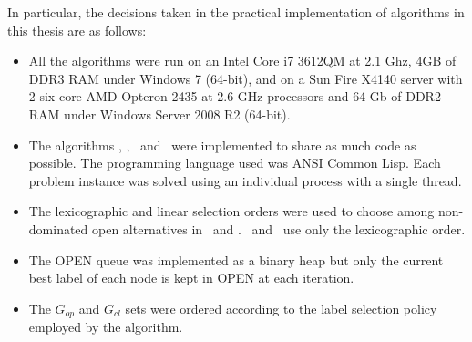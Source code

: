 In particular, the decisions taken in the practical implementation of algorithms in this thesis are as follows:
\begin{itemize}
	\item All the algorithms were run on an Intel Core i7 3612QM at 2.1 Ghz, 4GB of DDR3 RAM under Windows 7 (64-bit), and on a Sun Fire X4140 server with 2 six-core AMD Opteron 2435 at 2.6 GHz processors and 64 Gb of DDR2 RAM under Windows Server 2008 R2 (64-bit).
    \item The algorithms \namoa, \namoate, \lexgo\ and \lexgote \ were implemented to share as much code as possible. The programming language used was ANSI Common Lisp. Each problem instance was solved using an individual process with a single thread.
    \item The lexicographic and linear selection orders were used to choose among non-dominated open alternatives in \namoa \ and \lexgo. \namoate \ and \lexgote \ use only the lexicographic order.
    \item The OPEN queue was implemented as a binary heap but only the current best label of each node is kept in OPEN at each iteration.    
    \item The $G_{op}$ and $G_{cl}$ sets were ordered according to the label selection policy employed by the algorithm. 
\end{itemize}
